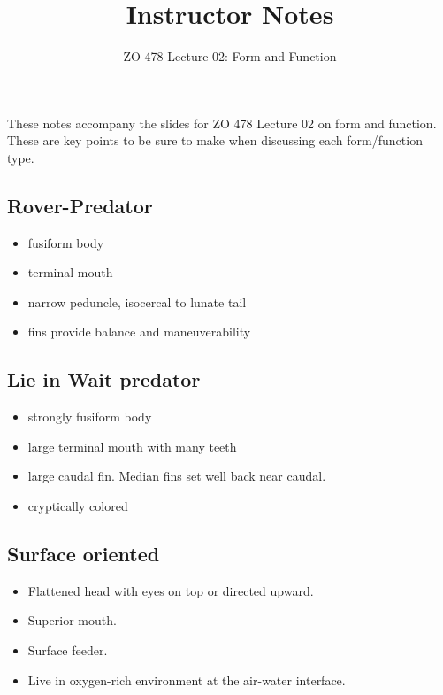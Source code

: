 \documentclass[11pt]{article}
\title{Instructor Notes}
\author{ZO 478 Lecture 02: Form and Function}
\date{}                                           %
\begin{document}
\maketitle

These notes accompany the slides for ZO 478 Lecture 02 on form and function. These are key points to be sure to make when discussing each form/function type.

\subsection*{Rover-Predator}

    \begin{itemize}
    	\item fusiform body
    	\item terminal mouth
    	\item narrow peduncle, isocercal to lunate tail
    	\item fins provide balance and maneuverability 
    \end{itemize}

\subsection*{Lie in Wait predator}

    \begin{itemize}
    	\item strongly fusiform body
    	\item large terminal mouth with many teeth
    	\item large caudal fin. Median fins set well back near caudal.
    	\item cryptically colored 
    \end{itemize}

\subsection*{Surface oriented}

    \begin{itemize}
    	\item Flattened head with eyes on top or directed upward.  
    	\item Superior mouth. 
    	\item Surface feeder.
    	\item Live in oxygen-rich environment at the air-water interface.
    \end{itemize}
\end{document}
